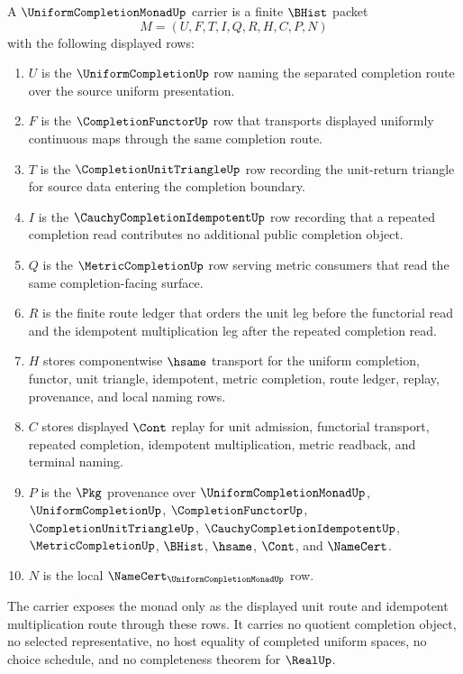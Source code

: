 \begin{definition}\label{def:uniform-completion-monad-carrier}
A $\UniformCompletionMonadUp$ carrier is a finite $\BHist$ packet
$$
M=(U,F,T,I,Q,R,H,C,P,N)
$$
with the following displayed rows:
\begin{enumerate}
\item $U$ is the $\UniformCompletionUp$ row naming the separated completion route over the source uniform presentation.
\item $F$ is the $\CompletionFunctorUp$ row that transports displayed uniformly continuous maps through the same completion route.
\item $T$ is the $\CompletionUnitTriangleUp$ row recording the unit-return triangle for source data entering the completion boundary.
\item $I$ is the $\CauchyCompletionIdempotentUp$ row recording that a repeated completion read contributes no additional public completion object.
\item $Q$ is the $\MetricCompletionUp$ row serving metric consumers that read the same completion-facing surface.
\item $R$ is the finite route ledger that orders the unit leg before the functorial read and the idempotent multiplication leg after the repeated completion read.
\item $H$ stores componentwise $\hsame$ transport for the uniform completion, functor, unit triangle, idempotent, metric completion, route ledger, replay, provenance, and local naming rows.
\item $C$ stores displayed $\Cont$ replay for unit admission, functorial transport, repeated completion, idempotent multiplication, metric readback, and terminal naming.
\item $P$ is the $\Pkg$ provenance over $\UniformCompletionMonadUp$, $\UniformCompletionUp$, $\CompletionFunctorUp$, $\CompletionUnitTriangleUp$, $\CauchyCompletionIdempotentUp$, $\MetricCompletionUp$, $\BHist$, $\hsame$, $\Cont$, and $\NameCert$.
\item $N$ is the local $\NameCert_{\UniformCompletionMonadUp}$ row.
\end{enumerate}
The carrier exposes the monad only as the displayed unit route and idempotent multiplication route through these rows. It carries no quotient completion object, no selected representative, no host equality of completed uniform spaces, no choice schedule, and no completeness theorem for $\RealUp$.
\end{definition}

